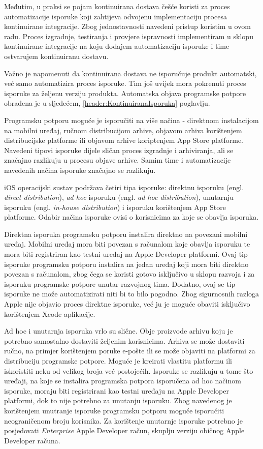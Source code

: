 \documentclass[times, utf8, diplomski, numeric]{fer}
\newcommand{\eng}[1]{(engl. \textit{#1})}
\begin{document}
Međutim, u praksi se pojam kontinuirana dostava češće koristi za proces automatizacije isporuke koji zahtijeva odvojenu implementaciju procesa kontinuirane integracije. Zbog jednostavnosti navedeni pristup koristim u ovom radu. Proces izgradnje, testiranja i provjere ispravnosti implementiram u sklopu kontinuirane integracije na koju dodajem automatizaciju isporuke i time ostvarujem kontinuiranu dostavu.

Važno je napomenuti da kontinuirana dostava ne isporučuje produkt automatski, već samo automatizira proces isporuke. Tim još uvijek mora pokrenuti proces isporuke za željenu verziju produkta. Automatska objava programske potpore obrađena je u sljedećem, \ref{header:KontinuiranaIsporuka} poglavlju.

Programsku potporu moguće je isporučiti na više načina - direktnom instalacijom na mobilni uređaj, ručnom distribucijom arhive, objavom arhiva korištenjem distribucijske platforme ili objavom arhive koriptenjem App Store platforme. Navedeni tipovi isporuke dijele sličan proces izgradnje i arhiviranja, ali se značajno razlikuju u procesu objave arhive. Samim time i automatizacije navedenih načina isporuke značajno se razlikuju.

iOS operacijski sustav podržava četiri tipa isporuke: direktnu isporuku \eng{direct distribution}, \textit{ad hoc} isporuku \eng{ad hoc distribution}, unutarnju isporuku \eng{in-house distribution} i isporuku korištenjem App Store platforme. Odabir načina isporuke ovisi o korisnicima za koje se obavlja isporuka.

Direktna isporuka programsku potporu instalira direktno na povezani mobilni uređaj. Mobilni uređaj mora biti povezan s računalom koje obavlja isporuku te mora biti registriran kao testni uređaj na Apple Developer platformi. Ovaj tip isporuke programsku potporu instalira na jedan uređaj koji mora biti direktno povezan s računalom, zbog čega se koristi gotovo isključivo u sklopu razvoja i za isporuku programske potpore unutar razvojnog tima. Dodatno, ovaj se tip isporuke ne može automatizirati niti bi to bilo pogodno. Zbog sigurnosnih razloga Apple nije objavio proces direktne isporuke, već ju je moguće obaviti isključivo korištenjem Xcode aplikacije.

Ad hoc i unutarnja isporuka vrlo su slične. Obje proizvode arhivu koju je potrebno samostalno dostaviti željenim korisnicima. Arhiva se može dostaviti ručno, na primjer korištenjem poruke e-pošte ili se može objaviti na platformi za distribuciju programske potpore. Moguće je kreirati vlastitu platformu ili iskoristiti neku od velikog broja već postojećih. Isporuke se razlikuju u tome što uređaji, na koje se instalira programska potpora isporučena ad hoc načinom isporuke, moraju biti registrirani kao testni uređaju na Apple Developer platformi, dok to nije potrebno za unutanju isporuku. Zbog navedenog je korištenjem unutranje isporuke programsku potporu moguće isporučiti neograničenom broju korisnika. Za korištenje unutarnje isporuke potrebno je posjedovati \textit{Enterprise} Apple Developer račun, skuplju verziju običnog Apple Developer računa.
\end{document}
